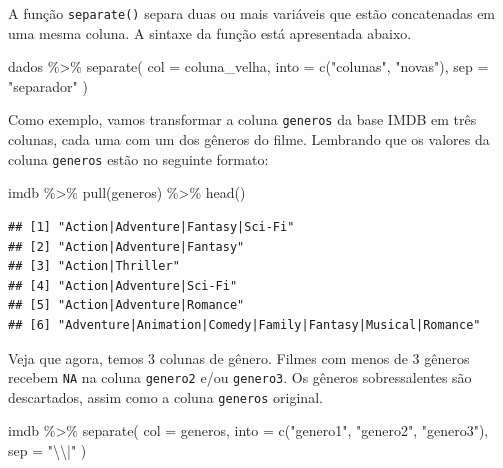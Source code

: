 \documentclass[
]{book}
\newenvironment{Shaded}{\begin{snugshade}}{\end{snugshade}}
\newcommand{\AttributeTok}[1]{\textcolor[rgb]{0.77,0.63,0.00}{#1}}
\newcommand{\FunctionTok}[1]{\textcolor[rgb]{0.00,0.00,0.00}{#1}}
\newcommand{\NormalTok}[1]{#1}
\newcommand{\SpecialCharTok}[1]{\textcolor[rgb]{0.00,0.00,0.00}{#1}}
\newcommand{\StringTok}[1]{\textcolor[rgb]{0.31,0.60,0.02}{#1}}
\begin{document}
A função \texttt{separate()} separa duas ou mais variáveis que estão concatenadas em uma mesma coluna. A sintaxe da função está apresentada abaixo.

\begin{Shaded}
\begin{Highlighting}[]
\NormalTok{dados }\SpecialCharTok{\%\textgreater{}\%} 
  \FunctionTok{separate}\NormalTok{( }
    \AttributeTok{col =}\NormalTok{ coluna\_velha, }
    \AttributeTok{into =} \FunctionTok{c}\NormalTok{(}\StringTok{"colunas"}\NormalTok{, }\StringTok{"novas"}\NormalTok{),}
    \AttributeTok{sep =} \StringTok{"separador"}
\NormalTok{  )}
\end{Highlighting}
\end{Shaded}

Como exemplo, vamos transformar a coluna \texttt{generos} da base IMDB em três colunas, cada uma com um dos gêneros do filme. Lembrando que os valores da coluna \texttt{generos} estão no seguinte formato:

\begin{Shaded}
\begin{Highlighting}[]
\NormalTok{imdb }\SpecialCharTok{\%\textgreater{}\%} \FunctionTok{pull}\NormalTok{(generos) }\SpecialCharTok{\%\textgreater{}\%} \FunctionTok{head}\NormalTok{()}
\end{Highlighting}
\end{Shaded}

\begin{verbatim}
## [1] "Action|Adventure|Fantasy|Sci-Fi"                          
## [2] "Action|Adventure|Fantasy"                                 
## [3] "Action|Thriller"                                          
## [4] "Action|Adventure|Sci-Fi"                                  
## [5] "Action|Adventure|Romance"                                 
## [6] "Adventure|Animation|Comedy|Family|Fantasy|Musical|Romance"
\end{verbatim}

Veja que agora, temos 3 colunas de gênero. Filmes com menos de 3 gêneros recebem \texttt{NA} na coluna \texttt{genero2} e/ou \texttt{genero3}. Os gêneros sobressalentes são descartados, assim como a coluna \texttt{generos} original.

\begin{Shaded}
\begin{Highlighting}[]
\NormalTok{imdb }\SpecialCharTok{\%\textgreater{}\%} 
  \FunctionTok{separate}\NormalTok{( }
    \AttributeTok{col =}\NormalTok{ generos,}
    \AttributeTok{into =} \FunctionTok{c}\NormalTok{(}\StringTok{"genero1"}\NormalTok{, }\StringTok{"genero2"}\NormalTok{, }\StringTok{"genero3"}\NormalTok{), }
    \AttributeTok{sep =} \StringTok{"}\SpecialCharTok{\textbackslash{}\textbackslash{}}\StringTok{|"}
\NormalTok{  )}
\end{Highlighting}
\end{Shaded}
\end{document}
